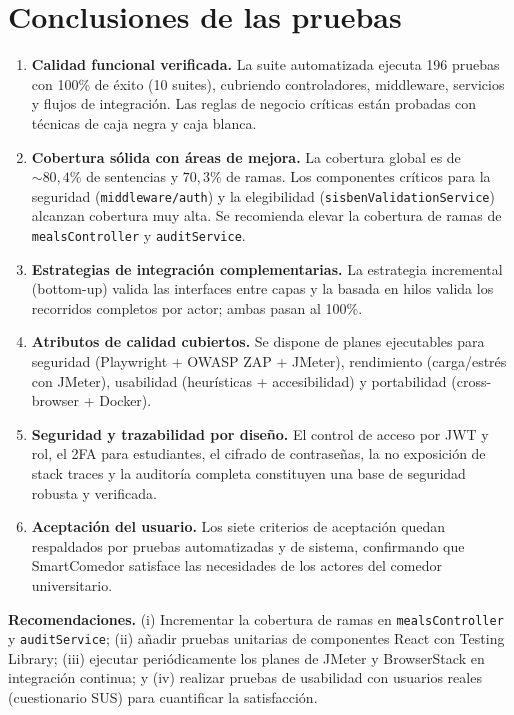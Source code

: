 \documentclass[stu,11pt,floatsintext]{apa7}
\begin{document}
\section{Conclusiones de las pruebas}
\begin{enumerate}[leftmargin=1.5em]
\item \textbf{Calidad funcional verificada.} La suite automatizada ejecuta 196 pruebas
con 100\% de éxito (10 suites), cubriendo controladores, middleware, servicios y flujos
de integración. Las reglas de negocio críticas están probadas con técnicas de caja negra
y caja blanca.
\item \textbf{Cobertura sólida con áreas de mejora.} La cobertura global es de
$\sim 80,4\%$ de sentencias y $70,3\%$ de ramas. Los componentes críticos para la
seguridad (\texttt{middleware/auth}) y la elegibilidad
(\texttt{sisbenValidationService}) alcanzan cobertura muy alta. Se recomienda elevar la
cobertura de ramas de \texttt{mealsController} y \texttt{auditService}.
\item \textbf{Estrategias de integración complementarias.} La estrategia incremental
(bottom-up) valida las interfaces entre capas y la basada en hilos valida los recorridos
completos por actor; ambas pasan al 100\%.
\item \textbf{Atributos de calidad cubiertos.} Se dispone de planes ejecutables para
seguridad (Playwright + OWASP ZAP + JMeter), rendimiento (carga/estrés con JMeter),
usabilidad (heurísticas + accesibilidad) y portabilidad (cross-browser + Docker).
\item \textbf{Seguridad y trazabilidad por diseño.} El control de acceso por JWT y rol,
el 2FA para estudiantes, el cifrado de contraseñas, la no exposición de stack traces y la
auditoría completa constituyen una base de seguridad robusta y verificada.
\item \textbf{Aceptación del usuario.} Los siete criterios de aceptación quedan
respaldados por pruebas automatizadas y de sistema, confirmando que SmartComedor
satisface las necesidades de los actores del comedor universitario.
\end{enumerate}

\noindent\textbf{Recomendaciones.} (i) Incrementar la cobertura de ramas en
\texttt{mealsController} y \texttt{auditService}; (ii) añadir pruebas unitarias de
componentes React con Testing Library; (iii) ejecutar periódicamente los planes de JMeter
y BrowserStack en integración continua; y (iv) realizar pruebas de usabilidad con
usuarios reales (cuestionario SUS) para cuantificar la satisfacción.
\end{document}
